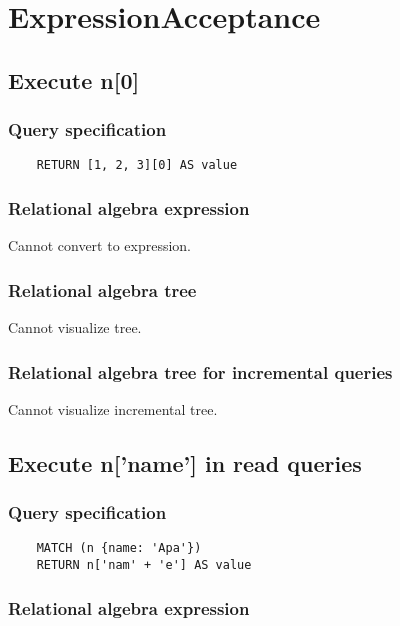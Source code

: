 	\section{ExpressionAcceptance}

	\subsection{Execute n[0]}

	\subsubsection*{Query specification}

	\begin{lstlisting}
	RETURN [1, 2, 3][0] AS value
	\end{lstlisting}


	\subsubsection*{Relational algebra expression}

	Cannot convert to expression.

	\subsubsection*{Relational algebra tree}

	Cannot visualize tree.

	\subsubsection*{Relational algebra tree for incremental queries}

	Cannot visualize incremental tree.
	\subsection{Execute n['name'] in read queries}

	\subsubsection*{Query specification}

	\begin{lstlisting}
	MATCH (n {name: 'Apa'})
	RETURN n['nam' + 'e'] AS value
	\end{lstlisting}


	\subsubsection*{Relational algebra expression}

